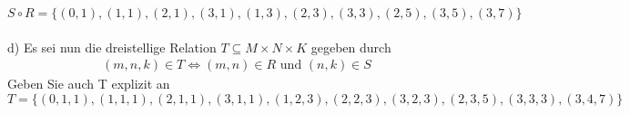 $S \circ R = \{(0,1), (1,1), (2,1), (3,1), (1,3), (2,3), (3,3), (2,5), (3,5), (3,7)\}$\\~\\

d) Es sei nun die dreistellige Relation $T \subseteq M \times N \times K$ gegeben durch
\begin{align*}
(m,n,k) \in T \Leftrightarrow (m,n) \in R \text{ und } (n,k) \in S
\end{align*}
\hspace{0.55cm}Geben Sie auch T explizit an\\

$T = \{(0,1,1), (1,1,1), (2,1,1), (3,1,1), (1,2,3), (2,2,3), (3,2,3), (2,3,5), (3,3,3), (3,4,7)\}$
\newpage